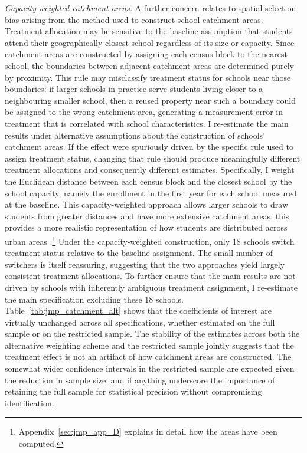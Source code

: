 \documentclass[12pt]{article}
\theoremstyle{plain}
\theoremstyle{plain}
\theoremstyle{plain}
\theoremstyle{definition}
\theoremstyle{plain}
\theoremstyle{definition}
\theoremstyle{plain}
\theoremstyle{remark}
\theoremstyle{definition}
\theoremstyle{definition}
\theoremstyle{plain}
\begin{document}
\emph{Capacity-weighted catchment areas.} A further concern relates to spatial selection bias arising from the method used to construct school catchment areas. Treatment allocation may be sensitive to the baseline assumption that students attend their geographically closest school regardless of its size or capacity. Since catchment areas are constructed by assigning each census block to the nearest school, the boundaries between adjacent catchment areas are determined purely by proximity. This rule may misclassify treatment status for schools near those boundaries: if larger schools in practice serve students living closer to a neighbouring smaller school, then a reused property near such a boundary could be assigned to the wrong catchment area, generating a measurement error in treatment that is correlated with school characteristics.
I re-estimate the main results under alternative assumptions about the construction of schools' catchment areas. If the effect were spuriously driven by the specific rule used to assign treatment status, changing that rule should produce meaningfully different treatment allocations and consequently different estimates. Specifically, I weight the Euclidean distance between each census block and the closest school by the school capacity, namely the enrollment in the first year for each school measured at the baseline. This capacity-weighted approach allows larger schools to draw students from greater distances and have more extensive catchment areas; this provides a more realistic representation of how students are distributed across urban areas \citep{pearce_techniques_2000}.\footnote{Appendix~\ref{sec:jmp_app_D} explains in detail how the areas have been computed.} 
Under the capacity-weighted construction, only 18 schools switch treatment status relative to the baseline assignment. The small number of switchers is itself reassuring, suggesting that the two approaches yield largely consistent treatment allocations. To further ensure that the main results are not driven by schools with inherently ambiguous treatment assignment, I re-estimate the main specification excluding these 18 schools. Table~\ref{tab:jmp_catchment_alt} shows that the coefficients of interest are virtually unchanged across all specifications, whether estimated on the full sample or on the restricted sample. The stability of the estimates across both the alternative weighting scheme and the restricted sample jointly suggests that the treatment effect is not an artifact of how catchment areas are constructed. The somewhat wider confidence intervals in the restricted sample are expected given the reduction in sample size, and if anything underscore the importance of retaining the full sample for statistical precision without compromising identification. \par
\end{document}

